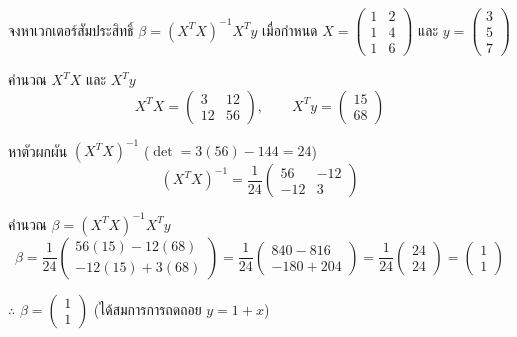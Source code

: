 \begin{ex}
\label{ex:linear-regression}
จงหาเวกเตอร์สัมประสิทธิ์ $\beta = (X^T X)^{-1} X^T y$ เมื่อกำหนด $X = \begin{pmatrix} 1 & 2 \\ 1 & 4 \\ 1 & 6 \end{pmatrix}$ และ $y = \begin{pmatrix} 3 \\ 5 \\ 7 \end{pmatrix}$
\end{ex}
\begin{solution}
คำนวณ $X^T X$ และ $X^T y$ \[ X^T X = \begin{pmatrix} 3 & 12 \\ 12 & 56 \end{pmatrix}, \qquad X^T y = \begin{pmatrix} 15 \\ 68 \end{pmatrix} \]

หาตัวผกผัน $(X^T X)^{-1}$ ($\det = 3(56)-144 = 24$) \[ (X^T X)^{-1} = \frac{1}{24}\begin{pmatrix} 56 & -12 \\ -12 & 3 \end{pmatrix} \]

คำนวณ $\beta = (X^T X)^{-1} X^T y$ \[ \beta = \frac{1}{24}\begin{pmatrix} 56(15) - 12(68) \\ -12(15) + 3(68) \end{pmatrix} = \frac{1}{24}\begin{pmatrix} 840 - 816 \\ -180 + 204 \end{pmatrix} = \frac{1}{24}\begin{pmatrix} 24 \\ 24 \end{pmatrix} = \begin{pmatrix} 1 \\ 1 \end{pmatrix} \]

$\therefore$ $\beta = \begin{pmatrix} 1 \\ 1 \end{pmatrix}$ (ได้สมการการถดถอย $y = 1 + x$) \solhere
\end{solution}

